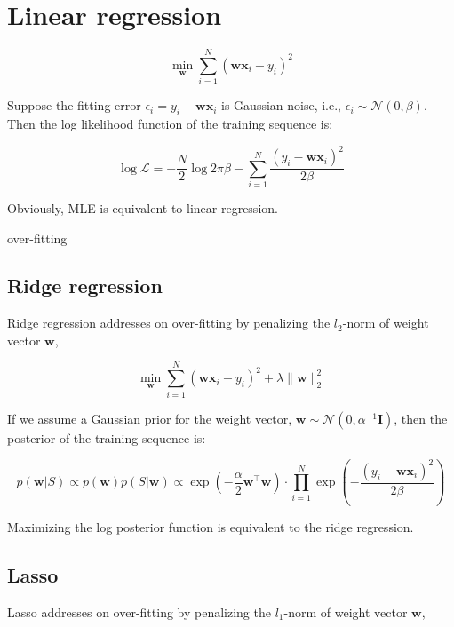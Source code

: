 \documentclass{article}
\begin{document}
\section{Linear regression}

	\begin{equation}
	\min_\mathbf{w} \sum_{i=1}^N (\mathbf{wx}_i - y_i)^2 
	\end{equation}

	Suppose the fitting error $\epsilon_i = y_i-\mathbf{wx}_i$ is Gaussian noise, i.e., $\epsilon_i \sim\mathcal{N}(0,\beta)$. Then the log likelihood function of the training sequence is:
	
	\begin{equation}
	\log \mathcal{L} = -\frac{N}{2} \log 2\pi\beta - \sum_{i=1}^N \frac{(y_i-\mathbf{wx}_i)^2}{2\beta}
	\end{equation}

Obviously, MLE is equivalent to linear regression.


	over-fitting

\subsection{Ridge regression}

	Ridge regression addresses on over-fitting by penalizing the $l_2$-norm of weight vector $\mathbf{w}$,
	
	\begin{equation*}
	\min_\mathbf{w} \sum_{i=1}^N (\mathbf{wx}_i - y_i)^2 + \lambda\|\mathbf{w}\|^2_2
	\end{equation*}

	If we assume a Gaussian prior for the weight vector, $\mathbf{w}\sim\mathcal{N}(0,\alpha^{-1}\mathbf{I})$, then the posterior of the training sequence is:
	
	\begin{equation}
	p(\mathbf{w}|S) \propto p(\mathbf{w}) p(S|\mathbf{w}) \propto \exp \left( -\frac{\alpha}{2} \mathbf{w}^\top \mathbf{w} \right) \cdot \prod_{i=1}^N \exp \left( -\frac{(y_i-\mathbf{wx}_i)^2}{2\beta} \right)
	\end{equation}
	
Maximizing the log posterior function is equivalent to the ridge regression.
	
\subsection{Lasso}

	Lasso addresses on over-fitting by penalizing the $l_1$-norm of weight vector $\mathbf{w}$,
		
\end{document}
